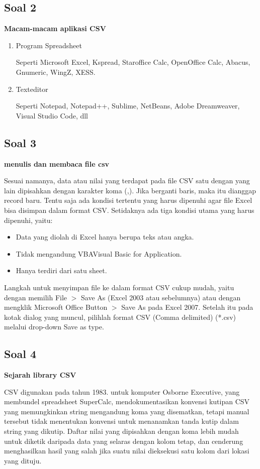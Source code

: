 \subsection{Soal 2}	

\textbf{Macam-macam aplikasi CSV}
\begin{enumerate}
\item Program Spreadsheet

Seperti Microsoft Excel, Kspread, Staroffice Calc, OpenOffice Calc, Abacus, Gnumeric, WingZ, XESS.			
\item Texteditor

Seperti Notepad, Notepad++, Sublime, NetBeans, Adobe Dreamweaver, Visual Studio Code, dll 

\end{enumerate}

\subsection{Soal 3}

\textbf{menulis dan membaca file csv}

Sesuai namanya, data atau nilai yang terdapat pada file CSV satu dengan yang lain dipisahkan dengan karakter koma (,). Jika berganti baris, maka itu dianggap record baru. Tentu saja ada kondisi tertentu yang harus dipenuhi agar file Excel bisa disimpan dalam format CSV. Setidaknya ada tiga kondisi utama yang harus dipenuhi, yaitu:
	\begin{itemize}
	\item Data yang diolah di Excel hanya berupa teks atau angka.
	\item Tidak mengandung VBA{Visual Basic for Application}.
	\item Hanya terdiri dari satu sheet.
	\end{itemize}

Langkah untuk menyimpan file ke dalam format CSV cukup mudah, yaitu dengan memilih File $>$ Save As (Excel 2003 atau sebelumnya) atau dengan mengklik Microsoft Office Button $>$ Save As pada Excel 2007. Setelah itu pada kotak dialog yang muncul, pilihlah format CSV (Comma delimited) (*.csv) melalui drop-down Save as type.

\subsection{Soal 4}

\textbf{Sejarah library CSV}

CSV digunakan pada tahun 1983. untuk komputer Osborne Executive, yang membundel spreadsheet SuperCalc, mendokumentasikan konvensi kutipan CSV yang memungkinkan string mengandung koma yang disematkan, tetapi manual tersebut tidak menentukan konvensi untuk menanamkan tanda kutip dalam string yang dikutip. Daftar nilai yang dipisahkan dengan koma lebih mudah untuk diketik daripada data yang selaras dengan kolom tetap, dan cenderung menghasilkan hasil yang salah jika suatu nilai dieksekusi satu kolom dari lokasi yang dituju.

